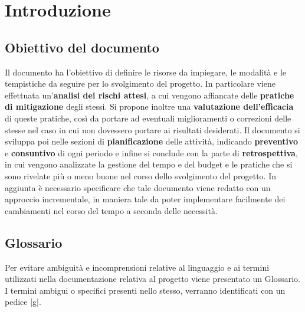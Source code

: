 \documentclass[10pt, a4paper]{article}
\title{\titolo}
\author{SWEetCode}
\begin{document}



\newpage

\tableofcontents
\newpage
\listoffigures
\newpage
\listoftables
\newpage


\section{Introduzione}


\subsection{Obiettivo del documento}
Il documento ha l'obiettivo di definire le risorse da impiegare, le modalità e le tempistiche da seguire per lo svolgimento del progetto. In particolare viene effettuata un'\textbf{analisi dei rischi attesi}, a cui vengono affiancate delle \textbf{pratiche di mitigazione} degli stessi. Si propone inoltre una \textbf{valutazione dell'efficacia} di queste pratiche, così da portare ad eventuali miglioramenti o correzioni delle stesse nel caso in cui non dovessero portare ai risultati desiderati.
Il documento si sviluppa poi nelle sezioni di \textbf{pianificazione} delle attività, indicando \textbf{preventivo} e \textbf{consuntivo} di ogni periodo e infine si conclude con la parte di \textbf{retrospettiva}, in cui vengono analizzate la gestione del tempo e del budget e le pratiche che si sono rivelate più o meno buone nel corso dello svolgimento del progetto.
In aggiunta è necessario specificare che tale documento viene redatto con un approccio incrementale, in maniera tale da poter implementare facilmente dei cambiamenti nel corso del tempo a seconda delle necessità.




\subsection{Glossario}
Per evitare ambiguità e incomprensioni relative al linguaggio e ai termini utilizzati nella documentazione relativa al progetto viene presentato un Glossario. I termini ambigui o specifici presenti nello stesso, verranno identificati con un pedice |g|.
\end{document}
